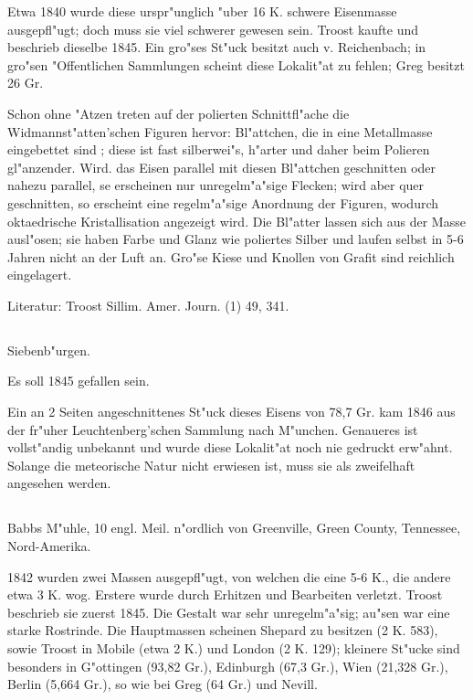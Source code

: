 \documentclass[a4paper, 11pt, oneside]{article}
\begin{document}
Etwa 1840 wurde diese urspr"unglich "uber 16 K. schwere Eisenmasse ausgepfl"ugt; doch muss sie viel schwerer gewesen sein. Troost kaufte und beschrieb dieselbe 1845. Ein gro"ses St"uck besitzt auch v. Reichenbach; in gro"sen "Offentlichen Sammlungen scheint diese Lokalit"at zu fehlen; Greg besitzt 26 Gr.

Schon ohne "Atzen treten auf der polierten Schnittfl"ache die Widmannst"atten'schen Figuren hervor: Bl"attchen, die in eine Metallmasse eingebettet sind ; diese ist fast silberwei"s, h"arter und daher beim Polieren gl"anzender. Wird. das Eisen parallel mit diesen Bl"attchen geschnitten oder nahezu parallel, se erscheinen nur unregelm"a"sige Flecken; wird aber quer geschnitten, so erscheint eine regelm"a"sige Anordnung der Figuren, wodurch oktaedrische Kristallisation angezeigt wird. Die Bl"atter lassen sich aus der Masse ausl"osen; sie haben Farbe und Glanz wie poliertes Silber und laufen selbst in 5-6 Jahren nicht an der Luft an. Gro"se Kiese und Knollen von Grafit sind reichlich eingelagert.

\normalsize
Literatur: Troost Sillim. Amer. Journ. (1) 49, 341.

\subsection{}
\LARGE
\paragraph{}
Siebenb"urgen.

Es soll 1845 gefallen sein.

Ein an 2 Seiten angeschnittenes St"uck dieses Eisens von 78,7 Gr. kam 1846 aus der fr"uher Leuchtenberg'schen Sammlung nach M"unchen. Genaueres ist vollst"andig unbekannt und wurde diese Lokalit"at noch nie gedruckt erw"ahnt. Solange die meteorische Natur nicht erwiesen ist, muss sie als zweifelhaft angesehen werden.

\subsection{}
\paragraph{}
Babbs M"uhle, 10 engl. Meil. n"ordlich von Greenville, Green County, Tennessee, Nord-Amerika.

1842 wurden zwei Massen ausgepfl"ugt, von welchen die eine 5-6 K., die andere etwa 3 K. wog. Erstere wurde durch Erhitzen und Bearbeiten verletzt. Troost beschrieb sie zuerst 1845. Die Gestalt war sehr unregelm"a"sig; au"sen war eine starke Rostrinde. Die Hauptmassen scheinen Shepard zu besitzen (2 K. 583), sowie Troost in Mobile (etwa 2 K.) und London (2 K. 129); kleinere St"ucke sind besonders in G"ottingen (93,82 Gr.), Edinburgh (67,3 Gr.), Wien (21,328 Gr.), Berlin (5,664 Gr.), so wie bei Greg (64 Gr.) und Nevill.
\end{document}
